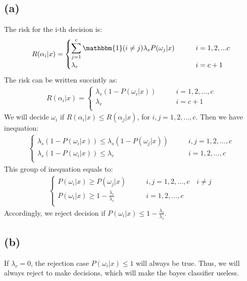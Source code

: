 \documentclass{article}
\renewcommand{\part}[1]{\subsection*{(#1)}}
\begin{document}
\part{a}
The risk for the i-th decision is:
\begin{align*}
  R(\alpha_{i}|x) =
  \begin{cases}
      \displaystyle\sum_{j=1}^c \mathbbm{1}(i \neq j)\lambda_{s}P(\omega_j | x) \qquad &i = 1, 2, ... c \\
      \lambda_r \qquad &i = c + 1 \\
  \end{cases}
\end{align*}
The risk can be written succintly as:
\begin{align*}
  R(\alpha_{i}|x) =
  \begin{cases}
      \lambda_s (1 - P(\omega_i | x)) \qquad &i = 1, 2, ..., c \\
      \lambda_r \qquad &i = c + 1 \\
  \end{cases}
\end{align*}
We will decide $\omega_i$ if $R(\alpha_i|x) \leq R(\alpha_j|x)$, for $i, j = 1, 2, ..., c$. Then we have inequation:
\begin{align*}
  \begin{cases}
      \lambda_s(1 - P(\omega_i | x)) \leq \lambda_s (1 - P(\omega_j | x)) \qquad &i, j = 1, 2, ..., c \\
      \lambda_s(1 - P(\omega_i | x)) \leq \lambda_r \quad &i = 1, 2, ..., c \\
  \end{cases}
\end{align*}
This group of inequation equals to:
\begin{align*}
  \begin{cases}
      P(\omega_i | x) \geq P(\omega_j | x) \qquad &i, j = 1, 2, ..., c \quad i \neq j \\
      P(\omega_i | x) \geq 1 - \frac{\lambda_r}{\lambda_s} &i = 1, 2, ..., c\\
  \end{cases}
\end{align*}
Accordingly, we reject decision if $P(\omega_i | x) \leq 1 - \frac{\lambda_r}{\lambda_s}$.
\part{b}
If $\lambda_r = 0$, the rejection case $P(\omega_i | x) \leq 1$ will always be true. Thus, we will always reject to make decisions, which will make the bayes classifier useless. \\
\end{document}
